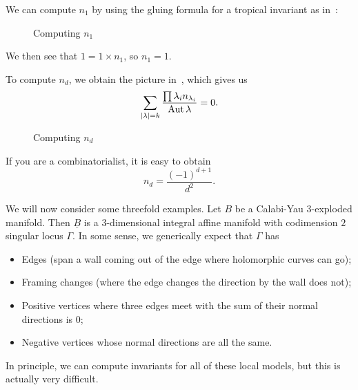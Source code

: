 \documentclass[leqno, openany]{memoir}
\theoremstyle{definition}
\theoremstyle{remark}
\theoremstyle{plain}
\theoremstyle{definition}
\theoremstyle{remark}
\newcommand{\ul}[1]{\underline{#1}}
\DeclareMathOperator{\Aut}{Aut}
\begin{document}
We can compute $n_1$ by using the gluing formula for a tropical invariant as in~:
\begin{figure}[htpb]
  \centering
  \caption{Computing $n_1$}
  \label{fig:n1}
\end{figure}
We then see that $1 = 1 \times n_1$, so $n_1 = 1$.

To compute $n_d$, we obtain the picture in~, which gives us
\[ \sum_{\abs{\lambda} = k} \frac{\prod \lambda_i n_{\lambda_i}}{\Aut \lambda} = 0. \]
\begin{figure}[htpb]
  \centering
  \caption{Computing $n_d$}
  \label{fig:nd}
\end{figure}
If you are a combinatorialist, it is easy to obtain
\[ n_d = \frac{(-1)^{d+1}}{d^2}. \]

We will now consider some threefold examples. Let $B$ be a Calabi-Yau 3-exploded manifold. Then $\ul{B}$ is a $3$-dimensional integral affine manifold with codimension $2$ singular locus $\Gamma$. In some sense, we generically expect that $\Gamma$ has
\begin{itemize}
\item Edges (span a wall coming out of the edge where holomorphic curves can go);
\item Framing changes (where the edge changes the direction by the wall does not);
\item Positive vertices where three edges meet with the sum of their normal directions is $0$;
\item Negative vertices whose normal directions are all the same.
\end{itemize}
In principle, we can compute invariants for all of these local models, but this is actually very difficult.
\end{document}
